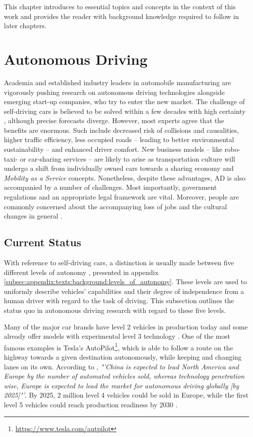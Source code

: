 This chapter introduces to essential topics and concepts in the context of this work and provides the reader with background knowledge required to follow in later chapters.

\section{Autonomous Driving}
\label{sec:background:autonomous_driving}
Academia and established industry leaders in automobile manufacturing are vigorously pushing research on autonomous driving technologies alongside emerging start-up companies, who try to enter the new market. The challenge of self-driving cars is believed to be solved within a few decades with high certainty \cite{Frost&SulivanConsulting2018}, although precise forecasts diverge. However, most experts agree that the benefits are enormous. Such include decreased risk of collisions and causalities, higher traffic efficiency, less occupied roads – leading to better environmental sustainability – and enhanced driver comfort. New business models – like robo-taxi- or car-sharing services – are likely to arise as transportation culture will undergo a shift from individually owned cars towards a sharing economy and \textit{Mobility as a Service} concepts. Nonetheless, despite these advantages, AD is also accompanied by a number of challenges. Most importantly, government regulations and an appropriate legal framework are vital. Moreover, people are commonly concerned about the accompanying loss of jobs and the cultural changes in general \cite{schoettle2014survey}. 

\subsection{Current Status}
\label{subsec:background:current_status}
With reference to self-driving cars, a distinction is usually made between five different levels of autonomy \cite{Klein}, presented in appendix \cref{subsec:appendix:texts:background:levels_of_autonomy}. These levels are used to uniformly describe vehicles' capabilities and their degree of independence from a human driver with regard to the task of driving. This subsection outlines the status quo in autonomous driving research with regard to these five levels.

Many of the major car brands have level 2 vehicles in production today and some already offer models with experimental level 3 technology \cite{Frost&SulivanConsulting2018}. One of the most famous examples is Tesla's AutoPilot\footnote{\url{https://www.tesla.com/autpilot}}, which is able to follow a route on the highway towards a given destination autonomously, while keeping and changing lanes on its own. According to \cite{Frost&SulivanConsulting2018}, \textit{"'China is expected to lead North America and Europe by the number of automated vehicles sold, whereas technology penetration wise, Europe is expected to lead the market for autonomous driving globally [by 2025]"'}. By 2025, 2 million level 4 vehicles could be sold in Europe, while the first level 5 vehicles could reach production readiness by 2030 \cite{McKinseyCenterforFutureMobility2019}. 

